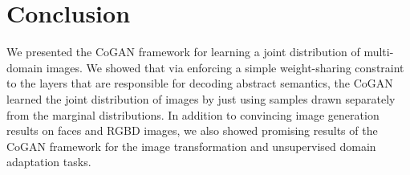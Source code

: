 \section{Conclusion}\label{sec::conc}

We presented the CoGAN framework for learning a joint distribution of multi-domain images. We showed that via enforcing a simple weight-sharing constraint to the layers that are responsible for decoding abstract semantics, the CoGAN learned the joint distribution of images by just using samples drawn separately from the marginal distributions. In addition to convincing image generation results on faces and RGBD images, we also showed promising results of the CoGAN framework for the image transformation and unsupervised domain adaptation tasks.
